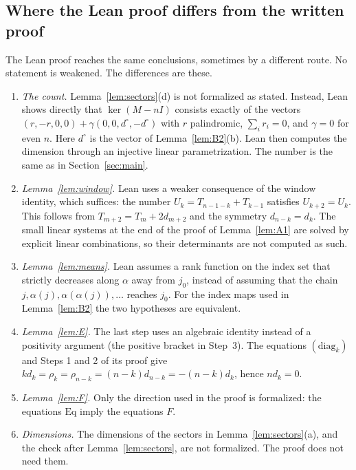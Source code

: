 \documentclass[11pt]{amsart}
\theoremstyle{plain}
\theoremstyle{definition}
\theoremstyle{remark}
\numberwithin{equation}{section}
\newcommand{\dc}{d^{\circ}}
\newcommand{\Eq}{\mathrm{Eq}}
\begin{document}
\subsection{Where the Lean proof differs from the written proof}
The Lean proof reaches the same conclusions, sometimes by a different route. No
statement is weakened. The differences are these.
\begin{enumerate}
\item \emph{The count.} Lemma~\ref{lem:sectors}(d) is not formalized as stated. Instead,
Lean shows directly that \(\ker(M-nI)\) consists exactly of the vectors
\((r,-r,0,0)+\gamma(0,0,\dc,-\dc)\) with \(r\) palindromic, \(\sum_ir_i=0\), and
\(\gamma=0\) for even \(n\). Here \(\dc\) is the vector of Lemma~\ref{lem:B2}(b). Lean
then computes the dimension through an injective linear parametrization. The number is
the same as in Section~\ref{sec:main}.
\item \emph{Lemma~\ref{lem:window}.} Lean uses a weaker consequence of the window
identity, which suffices: the number \(U_k=T_{n-1-k}+T_{k-1}\) satisfies \(U_{k+2}=U_k\). This
follows from \(T_{m+2}=T_m+2d_{m+2}\) and the symmetry \(d_{n-k}=d_k\). The small linear
systems at the end of the proof of Lemma~\ref{lem:A1} are solved by explicit linear
combinations, so their determinants are not computed as such.
\item \emph{Lemma~\ref{lem:means}.} Lean assumes a rank function on the index set that
strictly decreases along \(\alpha\) away from \(j_0\), instead of assuming that the chain
\(j,\alpha(j),\alpha(\alpha(j)),\dots\) reaches \(j_0\). For the index maps used in
Lemma~\ref{lem:B2} the two hypotheses are equivalent.
\item \emph{Lemma~\ref{lem:E}.} The last step uses an algebraic identity instead of a
positivity argument (the positive bracket in Step~3). The equations \((\mathrm{diag}_k)\) and Steps 1 and 2 of its proof give
\(kd_k=\rho_k=\rho_{n-k}=(n-k)d_{n-k}=-(n-k)d_k\), hence \(nd_k=0\).
\item \emph{Lemma~\ref{lem:F}.} Only the direction used in the proof is formalized:
the equations \(\Eq\) imply the equations \(F\).
\item \emph{Dimensions.} The dimensions of the sectors in
Lemma~\ref{lem:sectors}(a), and the check after Lemma~\ref{lem:sectors}, are not
formalized. The proof does not need them.
\end{enumerate}
\end{document}
